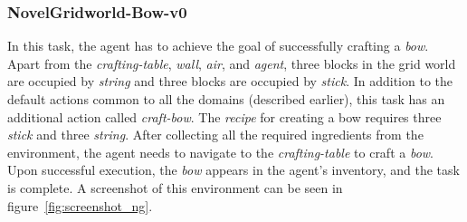 \documentclass[sigconf]{aamas}
\begin{document}
\subsubsection{\textbf{NovelGridworld-Bow-v0}}
\label{sec:bow-v-0}
In this task, the agent has to achieve the goal of successfully crafting a \emph{bow}. Apart from the \emph{crafting-table}, \emph{wall}, \emph{air}, and \emph{agent}, three blocks in the grid world are occupied by \emph{string} and three blocks are occupied by \emph{stick}. In addition to the default actions common to all the domains (described earlier), this task has an additional action called \emph{craft-bow}. The \emph{recipe} for creating a bow requires three \emph{stick} and three \emph{string}. After collecting all the required ingredients from the environment, the agent needs to navigate to the \emph{crafting-table} to craft a \emph{bow}. Upon successful execution, the \emph{bow} appears in the agent's inventory, and the task is complete. A screenshot of this environment can be seen in figure~\ref{fig:screenshot_ng}.
\end{document}
